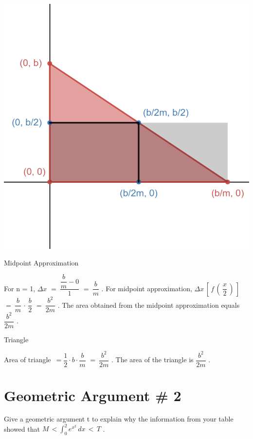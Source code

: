 \documentclass[letterpaper,12pt]{article}
\theoremstyle{definition}
\begin{document}
\includegraphics[scale=0.25]{desmos-graph.png}

\raggedright

\begin{minipage}{0.45\textwidth}
 \begin{center}
  Midpoint Approximation
 \end{center}
 For n = 1, $\Delta x$
 \vskip 16pt
 $=\ \dfrac{\dfrac{b}{m}-0}{1}$
 \vskip 16pt
 $=\ \dfrac{b}{m}$ .
 \vskip 16pt
 For midpoint approximation, $\Delta x\, [\, f\,(\, \dfrac{x}{2}\, )\, ]$
 \vskip 16pt
 $=\ \dfrac{b}{m}\, \cdot\, \dfrac{b}{2}$
 \vskip 16pt
 $=\ \dfrac{b^2}{2m}$ .
 \vskip 16pt
 The area obtained from the midpoint approximation equals $\dfrac{b^2}{2m}$ .
\end{minipage}
\hfill
\begin{minipage}{0.45\textwidth}
 \begin{center}
  \vspace{-56mm}
  Triangle
 \end{center}
 \vskip 16pt
 Area of triangle\ $=\dfrac{1}{2}\cdot b\cdot \dfrac{b}{m}$
 \vskip 16pt
 $=\ \dfrac{b^2}{2m}$ .
 \vskip 16pt
 The area of the triangle is $\dfrac{b^2}{2m}$ .
\end{minipage}

\pagebreak

\section{Geometric Argument \# 2}

\begin{large}

  Give a geometric argument t to explain why the information from your table showed that $M\, <  \int_{0}^{2} e^{x^2} \, dx\, <\, T$ .

\end{large}
\end{document}
